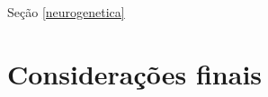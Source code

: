 \documentclass[
	article,			%
	12pt,				%
	oneside,			%
	a4paper,			%
	english,			%
	brazil,				%
	sumario=tradicional
	]{abntex2}
\begin{document}
Seção \ref{neurogenetica}



% 
\section*{Considerações finais}


\postextual







\end{document}
